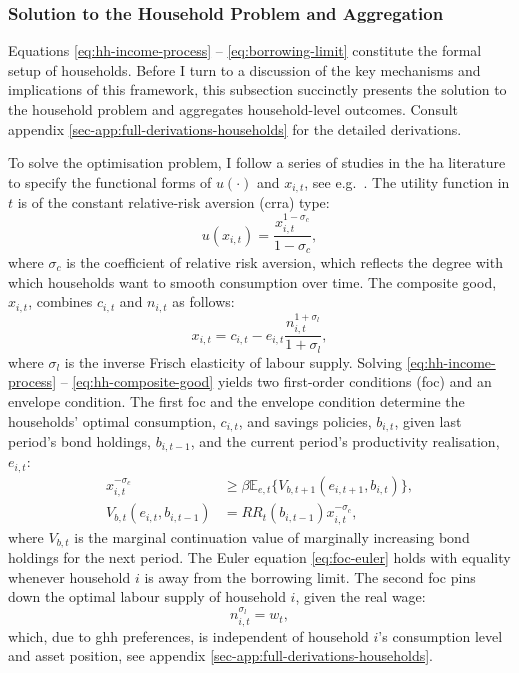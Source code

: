 \documentclass[12pt]{article} %
\numberwithin{equation}{section} %
\numberwithin{figure}{section}
\numberwithin{table}{section}
\begin{document}
\subsubsection{Solution to the Household Problem and Aggregation}
\label{sec:model-hh-solution}

Equations \eqref{eq:hh-income-process} -- \eqref{eq:borrowing-limit} constitute the formal setup of households. Before I turn to a discussion of the key mechanisms and implications of this framework, this subsection succinctly presents the solution to the household problem and aggregates household-level outcomes. Consult appendix \ref{sec-app:full-derivations-households} for the detailed derivations.

To solve the optimisation problem, I follow a series of studies in the \Gls{ha} literature to specify the functional forms of $u( \cdot )$ and $x_{i,t}$, see e.g.~\textcite{bayer2023}. The utility function in $t$ is of the constant relative-risk aversion (\Gls{crra}) type:
\begin{equation}
    u(x_{i,t}) = \frac{x_{i,t}^{1-\sigma_c}}{1-\sigma_c}, \label{eq:hh-utility-fun}
\end{equation}
where $\sigma_c$ is the coefficient of relative risk aversion, which reflects the degree with which households want to smooth consumption over time. The composite good, $x_{i,t}$, combines $c_{i,t}$ and $n_{i,t}$ as follows:
\begin{equation}
    x_{i,t} = c_{i,t} - e_{i,t}\frac{n_{i,t}^{1+\sigma_l}}{1+\sigma_l},
    \label{eq:hh-composite-good}
\end{equation}
where $\sigma_l$ is the inverse Frisch elasticity of labour supply. Solving \eqref{eq:hh-income-process} -- \eqref{eq:hh-composite-good} yields two first-order conditions (\Gls{foc}) and an envelope condition. The first \Gls{foc} and the envelope condition determine the households' optimal consumption, $c_{i,t}$, and savings policies, $b_{i,t}$, given last period's bond holdings, $b_{i,t-1}$, and the current period's productivity realisation, $e_{i,t}$:
\begin{align}
    x_{i,t}^{-\sigma_c} &\ge \beta \mathbb{E}_{e,t} \{ V_{b,t+1} (e_{i,t+1}, b_{i,t}) \}, \label{eq:foc-euler} \\
    V_{b,t} (e_{i,t}, b_{i,t-1}) &= RR_t (b_{i,t-1}) x_{i,t}^{-\sigma_c}, \label{eq:foc-envelope} 
\end{align}
where $V_{b,t}$ is the marginal continuation value of marginally increasing bond holdings for the next period. The Euler equation \eqref{eq:foc-euler} holds with equality whenever household $i$ is away from the borrowing limit. The second \Gls{foc} pins down the optimal labour supply of household $i$, given the real wage:
\begin{equation}
n_{i,t}^{\sigma_l} = w_t, \label{eq:foc-labour-supply}
\end{equation}
which, due to \Gls{ghh} preferences, is independent of household $i$'s consumption level and asset position, see appendix \ref{sec-app:full-derivations-households}.
\end{document}
